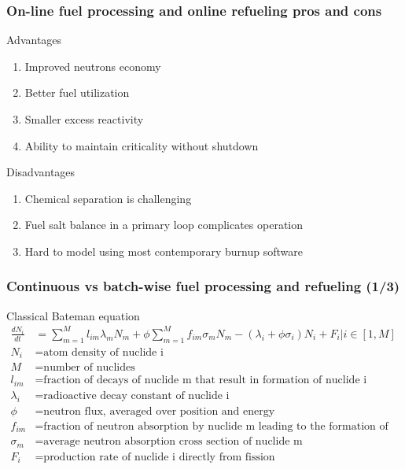 \begin{frame}
\frametitle{On-line fuel processing and online refueling pros and cons}
\begin{block}{Advantages}
	\begin{enumerate}
		\item Improved neutrons economy
		\item Better fuel utilization
		\item Smaller excess reactivity
		\item Ability to maintain criticality without shutdown
	\end{enumerate}
\end{block}

\begin{block}{Disadvantages}
	\begin{enumerate}
		\item Chemical separation is challenging
		\item Fuel salt balance in a primary loop complicates operation
		\item Hard to model using most contemporary burnup software
	\end{enumerate}
\end{block}

\end{frame}

\begin{frame}
\frametitle{Continuous vs batch-wise fuel processing  and refueling (1/3)}
		\vspace{-7mm}
\begin{block}{Classical Bateman equation}
	\begin{align}
	\frac{dN_i}{dt} &= \sum_{m=1}^{M}l_{im}\lambda_mN_m + 
	\phi\sum_{m=1}^{M}f_{im}\sigma_mN_m - (\lambda_i + \phi\sigma_i)N_i + F_i\Big|{i\in [1,M]} \nonumber\\
		N_i &= \mbox{atom density of nuclide i} \nonumber \\
	M &= \mbox{number of nuclides} \nonumber \\
	l_{im} &= \mbox{fraction of decays of nuclide m that result in formation of 
		nuclide i}\nonumber \\
	\lambda_i &= \mbox{radioactive decay constant of nuclide i} \nonumber \\
	\phi &= \mbox{neutron flux, averaged over position and energy} \nonumber \\
	f_{im} &= \mbox{fraction of neutron absorption by nuclide m leading to the 
		formation of nuclide i} \nonumber \\
	\sigma_m &= \mbox{average neutron absorption cross section of nuclide m} 
	\nonumber \\
	F_i &= \mbox{production rate of nuclide i directly from fission}\nonumber
	\end{align}
\end{block}
\end{frame}

